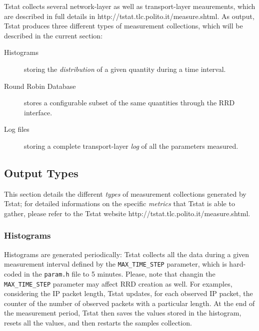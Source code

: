 \documentclass[11pt]{article}
\begin{document}
Tstat collects several network-layer as well as transport-layer meaurements,
which are described in full details in
\textsf{http://tstat.tlc.polito.it/measure.shtml}. As output, Tstat produces three
different types of measurement collections, which will be described in the
current section:

\begin{description}

\item[Histograms] \mbox{}

storing the \textit{distribution} of a given quantity during a time interval.


\item[Round Robin Database] \mbox{}

stores a configurable subset of the same quantities through the RRD interface.


\item[Log files] \mbox{}

storing a complete transport-layer \textit{log} of all the parameters measured.

\end{description}
\subsection{Output Types\label{Output_Types}}


This section details the different \textit{types} of measurement collections
generated by Tstat; for detailed informations on  the specific \textit{metrics} 
that Tstat is able to gather, please refer to  the Tstat website 
\textsf{http://tstat.tlc.polito.it/measure.shtml}.

\subsubsection{Histograms\label{Histograms}}


Histograms are generated periodically: Tstat collects all the
data during a given measurement interval defined by the \texttt{MAX\_TIME\_STEP} 
parameter, which is hard-coded in the \texttt{param.h} file to 5 minutes. Please, note
that changin the \texttt{MAX\_TIME\_STEP} parameter may affect RRD creation as well.
For examples, considering the IP packet length, Tstat updates, for
each observed IP packet, the counter of the number of observed packets with a
particular length. At the end of the measurement period, Tstat then saves
the values stored in the histogram, resets all the values, and then restarts 
the samples collection.
\end{document}
